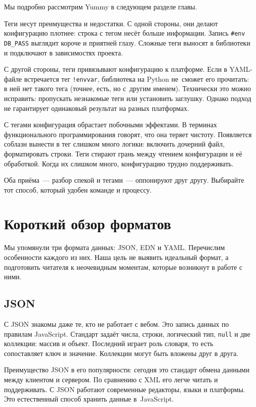 \noindent
Мы подробно рассмотрим Yummy в следующем разделе главы.

Теги несут преимущества и недостатки. С одной стороны, они делают конфигурацию
плотнее: строка с тегом несёт больше информации. Запись \verb|#env DB_PASS|
выглядит короче и приятней глазу. Сложные теги выносят в библиотеки и подключают
в зависимостях проекта.

С другой стороны, теги привязывают конфигурацию к платформе. Если в YAML-файле
встречается тег \verb|!envvar|, библиотека на Python не~сможет его прочитать: в
ней нет такого тега (точнее, есть, но с~другим именем). Технически это можно
исправить: пропускать незнакомые теги или установить заглушку. Однако подход не
гарантирует одинаковый результат на разных платформах.

С тегами конфигурация обрастает побочными эффектами. В терминах функционального
программирования говорят, что она теряет чистоту. Появляется соблазн вынести в
тег слишком много логики: включить дочерний файл, форматировать строки. Теги
стирают грань между чтением конфигурации и её обработкой. Когда их слишком
много, конфигурацию трудно поддерживать.

Оба приёма~--- разбор спекой и тегами~--- оппонируют друг другу. Выбирайте тот
способ, который удобен команде и процессу.

\section{Короткий обзор форматов}

Мы упомянули три формата данных: JSON, EDN и YAML. Перечислим особенности
каждого из них. Наша цель не выявить идеальный формат, а подготовить читателя к
неочевидным моментам, которые возникнут в работе с ними.

\subsection{JSON}


С JSON знакомы даже те, кто не работает с вебом. Это запись данных по правилам
JavaScript. Стандарт задаёт числа, строки, логический тип, \verb|null| и две
коллекции: массив и объект. Последний играет роль словаря, то есть сопоставляет
ключ и значение. Коллекции могут быть вложены друг в друга.


Преимущество JSON в его популярности: сегодня это стандарт обмена данными между
клиентом и сервером. По сравнению с XML его легче читать и поддерживать. С JSON
работают современные редакторы, языки и платформы. Это естественный способ
хранить данные в~JavaScript.

